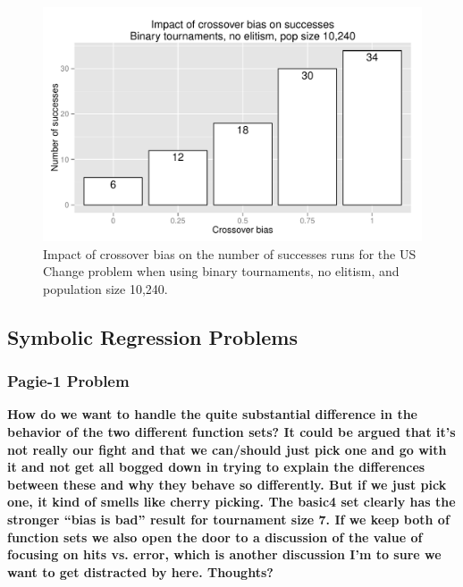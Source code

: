\documentclass{sig-alternate}
\begin{document}
\begin{figure}
\centering
\includegraphics[width=0.45 \textwidth]{Plots/US_change_successes_strong.pdf}
\caption{Impact of crossover bias on the number of successes runs for the US Change problem when using 
binary tournaments, no elitism, and population size 10,240.}
\label{fig:USChange_Successes_strong}
\end{figure}

%
%
%
%


\subsection{Symbolic Regression Problems}

\subsubsection{Pagie-1 Problem}

\textbf{How do we want to handle the quite substantial difference in the behavior of the two different function sets? It 
could be argued that it's not really our fight and that we can/should just pick one and go with it and not get all bogged 
down in trying to explain the differences between these and why they behave so differently. But if we just pick one, it 
kind of smells like cherry picking. The basic4 set clearly has the stronger ``bias is bad'' result for tournament size 7. If 
we keep both of function sets we also open the door to a discussion of the value of focusing on hits vs. error, which is 
another discussion I'm to sure we want to get distracted by here. Thoughts?}
\end{document}
